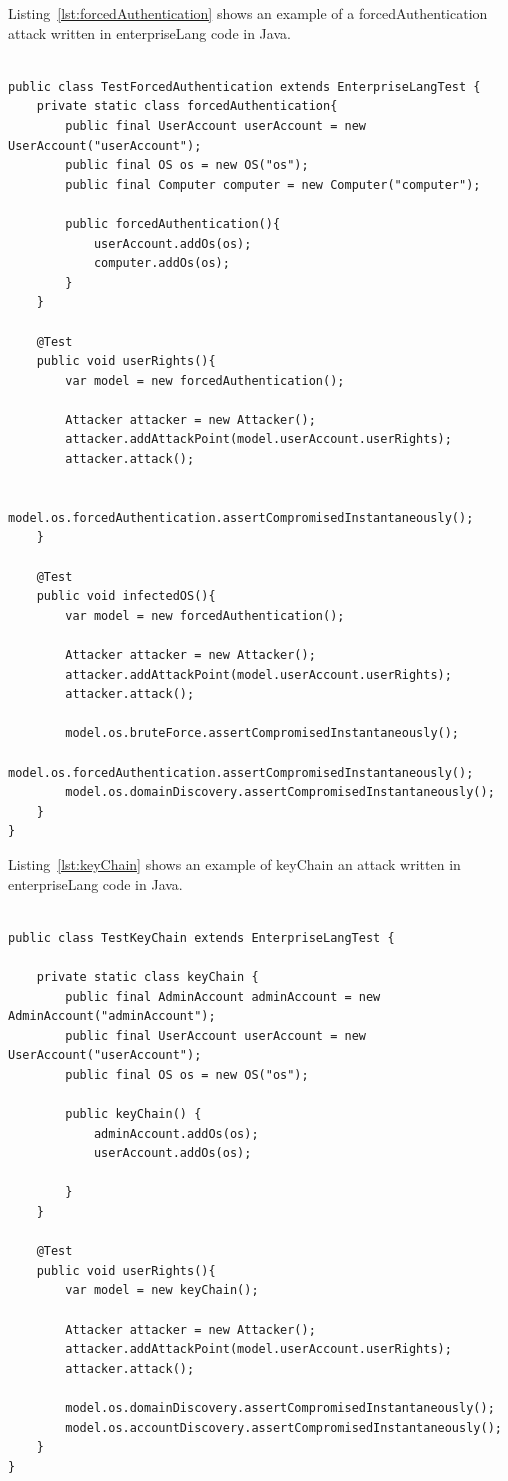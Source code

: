 \documentclass[english]{kththesis}
\begin{document}
\noindent Listing~\ref{lst:forcedAuthentication} shows an example of a forcedAuthentication attack written in enterpriseLang code in Java.

\begin{lstlisting}[caption={forcedAuthentication attack}, label=lst:forcedAuthentication]

public class TestForcedAuthentication extends EnterpriseLangTest {
    private static class forcedAuthentication{
        public final UserAccount userAccount = new UserAccount("userAccount");
        public final OS os = new OS("os");
        public final Computer computer = new Computer("computer");

        public forcedAuthentication(){
            userAccount.addOs(os);
            computer.addOs(os);
        }
    }

    @Test
    public void userRights(){
        var model = new forcedAuthentication();

        Attacker attacker = new Attacker();
        attacker.addAttackPoint(model.userAccount.userRights);
        attacker.attack();

        model.os.forcedAuthentication.assertCompromisedInstantaneously();
    }

    @Test
    public void infectedOS(){
        var model = new forcedAuthentication();

        Attacker attacker = new Attacker();
        attacker.addAttackPoint(model.userAccount.userRights);
        attacker.attack();

        model.os.bruteForce.assertCompromisedInstantaneously();
        model.os.forcedAuthentication.assertCompromisedInstantaneously();
        model.os.domainDiscovery.assertCompromisedInstantaneously();
    }
}
\end{lstlisting}

\noindent Listing~\ref{lst:keyChain} shows an example of keyChain an attack written in enterpriseLang code in Java.

\begin{lstlisting}[caption={keyChain attack}, label=lst:keyChain]

public class TestKeyChain extends EnterpriseLangTest {

    private static class keyChain {
        public final AdminAccount adminAccount = new AdminAccount("adminAccount");
        public final UserAccount userAccount = new UserAccount("userAccount");
        public final OS os = new OS("os");
        
        public keyChain() {
            adminAccount.addOs(os);
            userAccount.addOs(os);

        }
    }

    @Test
    public void userRights(){
        var model = new keyChain();

        Attacker attacker = new Attacker();
        attacker.addAttackPoint(model.userAccount.userRights);
        attacker.attack();

        model.os.domainDiscovery.assertCompromisedInstantaneously();
        model.os.accountDiscovery.assertCompromisedInstantaneously();
    }
}

\end{lstlisting}
\end{document}
